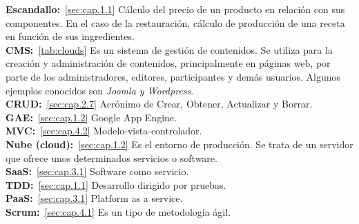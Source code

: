 
\textbf{Escandallo:}~\ref{sec:cap.1.1} Cálculo del precio de un producto en relación con sus componentes. En el caso de la restauración, cálculo de producción de una receta en función de sus ingredientes. \\

\textbf{CMS:}~\ref{tab:clouds} Es un sistema de gestión de contenidos. Se utiliza para la creación y administración de contenidos, principalmente en páginas web, por parte de los administradores, editores, participantes y demás usuarios. Algunos ejemplos conocidos son \emph{Joomla y Wordpress}.\\

\textbf{CRUD:}~\ref{sec:cap.2.7} Acrónimo de Crear, Obtener, Actualizar y Borrar. \\

\textbf{GAE:}~\ref{sec:cap.1.2} Google App Engine. \\

\textbf{MVC:}~\ref{sec:cap.4.2} Modelo-vista-controlador. \\

\textbf{Nube (cloud):}~\ref{sec:cap.1.2} Es el entorno de producción. Se trata de un servidor que ofrece unos determinados servicios o software. \\

\textbf{SaaS:}~\ref{sec:cap.3.1} Software como servicio. \\

\textbf{TDD:}~\ref{sec:cap.1.1} Desarrollo dirigido por pruebas. \\

\textbf{PaaS:}~\ref{sec:cap.3.1} Platform as a service.  \\

\textbf{Scrum:}~\ref{sec:cap.4.1}  Es un tipo de metodología ágil. \\
